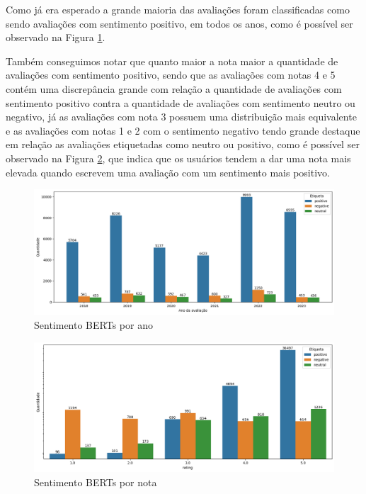Como já era esperado a grande maioria das avaliações foram classificadas como sendo avaliações com sentimento positivo, em todos os anos, como é possível ser observado na Figura \ref{img:sentimento_timechart_bert}.

Também conseguimos notar que quanto maior a nota maior a quantidade de avaliações com sentimento positivo, sendo que as avaliações com notas 4 e 5 contém uma discrepância grande com relação a quantidade de avaliações com sentimento positivo contra a quantidade de avaliações com sentimento neutro ou negativo, já as avaliações com nota 3 possuem uma distribuição mais equivalente e as avaliações com notas 1 e 2 com o sentimento negativo tendo grande destaque em relação as avaliações etiquetadas como neutro ou positivo, como é possível ser observado na Figura \ref{img:sentimento_nota_bert}, que indica que os usuários tendem a dar uma nota mais elevada quando escrevem uma avaliação com um sentimento mais positivo.

\begin{figure}
	\centering
	\includegraphics[width=1\textwidth]{figs/bert/sentimento_ano.png}
	\caption{Sentimento BERTs por ano}
	\label{img:sentimento_timechart_bert}
\end{figure}

\begin{figure}
	\centering
	\includegraphics[width=1\textwidth]{figs/bert/sentimento_nota.png}
	\caption{Sentimento BERTs por nota}
	\label{img:sentimento_nota_bert}
\end{figure}

